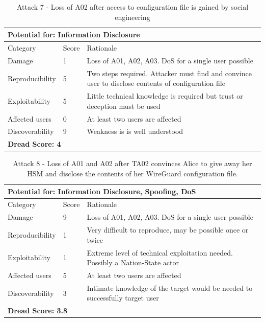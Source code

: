 \documentclass [11pt, proquest] {uwthesis}[2020/02/24]
\begin{document}
\begin{table}[H]
\label{attack7-hsm}
\begin{tabular}{|m{3cm}|m{.9cm}|p{27em} |}
\multicolumn{3}{l}{Potential for: Information Disclosure}                   \\
\hline
Category & Score & Rationale \\
\hline
Damage          & 1     & Loss of A01, A02, A03. DoS for a single user possible            \\
\hline
Reproducibility & 5     & Two steps required. Attacker must find and convince user to disclose contents of configuration file    \\
\hline
Exploitability & 5      & Little technical knowledge is required but trust or deception must be used   \\
\hline
Affected users  & 0     & At least two users are affected                      \\
\hline
Discoverability & 9     & Weakness is is well understood  \\
\hline
\multicolumn{3}{l}{\textbf{Dread Score: 4}} 
\end{tabular}
\caption{Attack 7 - Loss of A02 after access to configuration file is gained by social engineering}
\end{table}

\begin{table}[H]
\label{attack8-hsm}
\begin{tabular}{|m{3cm}|m{.9cm}|p{27em} |}
\multicolumn{3}{l}{Potential for: Information Disclosure, Spoofing, DoS}                   \\
\hline
Category & Score & Rationale \\
\hline
Damage          & 9     & Loss of A01, A02, A03. DoS for a single user possible            \\
\hline
Reproducibility & 1     & Very difficult to reproduce, may be possible once or twice  \\
\hline
Exploitability & 1      & Extreme level of technical exploitation needed. Possibly a Nation-State actor  \\
\hline
Affected users  & 5     & At least two users are affected                      \\
\hline
Discoverability & 3     & Intimate knowledge of the target would be needed to successfully target user \\
\hline
\multicolumn{3}{l}{\textbf{Dread Score: 3.8}} 
\end{tabular}
\caption{Attack 8 - Loss of A01 and A02 after TA02 convinces Alice to give away her HSM and disclose the contents of her WireGuard configuration file. }
\end{table}
\end{document}
